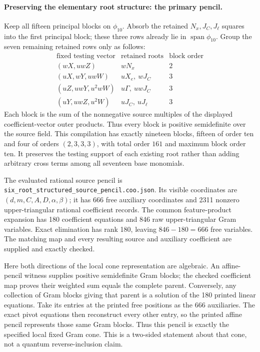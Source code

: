 \paragraph{Preserving the elementary root structure: the primary pencil.}
Keep all fifteen
principal blocks on $\phi_{10}$. Absorb the retained $N_x,J_C,J_\ell$
squares into the first principal block; these three rows already lie
in $\operatorname{span}\phi_{10}$. Group the seven remaining retained
rows only as follows:
\[
\begin{array}{c|c|c}
\text{fixed testing vector}&\text{retained roots}&\text{block order}\\\hline
(wX,uwZ)&wN_x&2\\
(uX,wY,uwW)&uX_e,\ wJ_C&3\\
(uZ,uwY,u^2wW)&u\Gamma,\ uwJ_C&3\\
(uY,uwZ,u^2W)&uJ_C,\ uJ_\ell&3
\end{array}
\]
Each block is the sum of the nonnegative source multiples of the
displayed coefficient-vector outer products. Thus every block is
positive semidefinite over the source field. This compilation has
exactly nineteen blocks, fifteen of order ten and four of orders
$(2,3,3,3)$, with total order $161$ and maximum block order ten.
It preserves the testing support of each existing root rather than
adding arbitrary cross terms among all seventeen base monomials.

The evaluated rational source pencil is
\texttt{six\_root\_structured\_source\_pencil.coo.json}.
Its visible coordinates are $(d,m,C,A,D,\alpha,\beta)$; it has
666 free auxiliary coordinates and 2311 nonzero upper-triangular
rational coefficient records. The common feature-product expansion
has 180 coefficient equations and 846 raw upper-triangular Gram
variables. Exact elimination has rank 180, leaving $846-180=666$
free variables. The matching map and every resulting source and
auxiliary coefficient are supplied and exactly checked.

Here both directions of the local cone representation are algebraic.
An affine-pencil witness supplies positive semidefinite Gram blocks;
the checked coefficient map proves their weighted sum equals the
complete parent. Conversely, any collection of Gram blocks giving
that parent is a solution of the 180 printed linear equations. Take
its entries at the printed free positions as the 666 auxiliaries.
The exact pivot equations then reconstruct every other entry, so the
printed affine pencil represents those same Gram blocks. Thus this
pencil is exactly the specified local fixed Gram cone. This is a
two-sided statement about that cone, not a quantum reverse-inclusion
claim.

